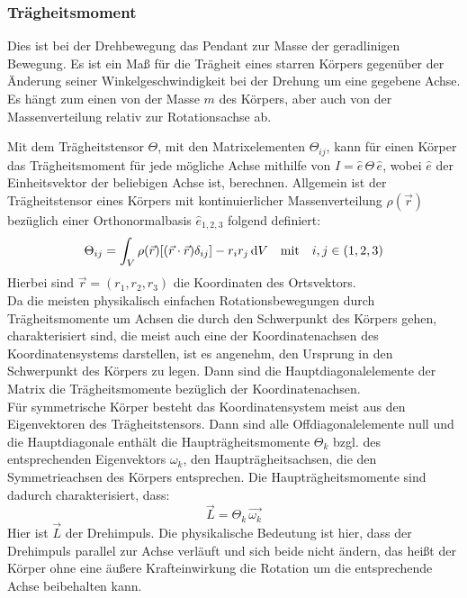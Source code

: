 \subsubsection{Trägheitsmoment}
Dies ist bei der Drehbewegung das Pendant zur Masse der geradlinigen Bewegung. Es ist ein Maß für die Trägheit eines starren Körpers gegenüber der Änderung seiner Winkelgeschwindigkeit bei der Drehung um eine gegebene Achse. Es hängt zum einen von der Masse \(m\) des Körpers, aber auch von der Massenverteilung relativ zur Rotationsachse ab.

Mit dem Trägheitstensor \(\Theta\), mit den Matrixelementen \(\Theta_{ij}\), kann für einen Körper das Trägheitsmoment für jede mögliche Achse mithilfe von \(I=\hat{e}\,\Theta \,\hat{e}\), wobei \(\hat{e}\) der Einheitsvektor der beliebigen Achse ist, berechnen. Allgemein ist der Trägheitstensor eines Körpers mit kontinuierlicher Massenverteilung \(\rho(\vec{r})\) bezüglich einer Orthonormalbasis \(\hat{e}_{1,2,3}\) folgend definiert:
\begin{equation}
    \Theta_{ij}=\int_V \rho(\vec{r})[(\vec{r}\cdot \vec{r})\delta_{ij}]-r_ir_j\mathop{}\!\mathrm{d} V\quad\text{mit}\quad i,j\in(1,2,3)
\end{equation}
Hierbei sind \(\vec{r}=(r_1,r_2,r_3)\) die Koordinaten des Ortsvektors. \\
Da die meisten physikalisch einfachen Rotationsbewegungen durch Trägheitsmomente um Achsen die durch den Schwerpunkt des Körpers gehen, charakterisiert sind, die meist auch eine der Koordinatenachsen des Koordinatensystems darstellen, ist es angenehm, den Ursprung in den Schwerpunkt des Körpers zu legen. Dann sind die Hauptdiagonalelemente der Matrix die Trägheitsmomente bezüglich der Koordinatenachsen.\\ Für symmetrische Körper besteht das Koordinatensystem meist aus den Eigenvektoren des Trägheitstensors. Dann sind alle Offdiagonalelemente null und die Hauptdiagonale enthält die Haupträgheitsmomente \(\Theta_k\) bzgl. des entsprechenden Eigenvektors \(\omega_k\), den Haupträgheitsachsen, die den Symmetrieachsen des Körpers entsprechen. Die Haupträgheitsmomente sind dadurch charakterisiert, dass:
\begin{equation}
    \vec{L}=\Theta_k\, \vec{\omega_k}
\end{equation}
Hier ist \(\vec{L}\) der Drehimpuls. Die physikalische Bedeutung ist hier, dass 
der Drehimpuls parallel zur Achse verläuft und sich beide nicht ändern, das heißt der Körper ohne eine äußere Krafteinwirkung die Rotation um die entsprechende Achse beibehalten kann. 

